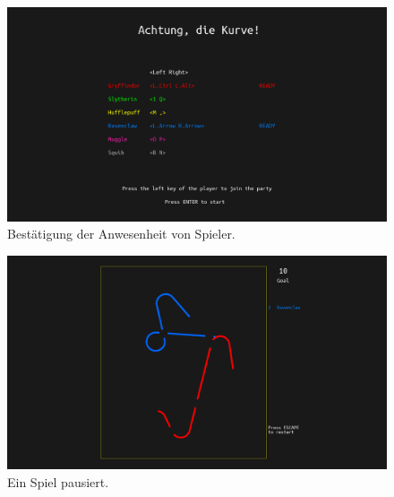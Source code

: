 \documentclass[doktyp=studarbeit]{TUBAFarbeiten}
\begin{document}
\begin{figure}[!htb]
	\centering
	\includegraphics[width=0.8\linewidth]{2.png}
	\caption{Bestätigung der Anwesenheit von Spieler.}
	\label{fig:confirmation}
\end{figure}

\begin{figure}[!htb]
	\centering
	\includegraphics[width=0.8\linewidth]{5.png}
	\caption{Ein Spiel pausiert.}
	\label{fig:pause}
\end{figure}


\printbibliography[heading=bibintoc]
\end{document}
